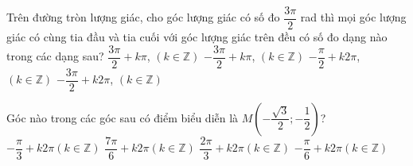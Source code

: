 \begin{ex}%
	Trên đường tròn lượng giác, cho góc lượng giác có số đo $\dfrac{3\pi}{2}$ rad thì mọi góc lượng giác có cùng tia  đầu và tia cuối với góc lượng giác trên đều có số đo dạng nào trong các dạng sau?
	\choice 
		{$\dfrac{3\pi}{2}+k \pi$,  $(k \in \mathbb{Z})$}
		{$-\dfrac{3\pi}{2}+k \pi$, $(k \in  \mathbb{Z})$}
		{\True $-\dfrac{\pi}{2}+k  2\pi$, $(k \in \mathbb{Z})$}
		 {$-\dfrac{3\pi}{2}+k 2\pi$, $(k \in \mathbb{Z})$}
\end{ex}

\begin{ex}%
	Góc nào trong các góc sau có điểm biểu diễn là  $M\left(-\dfrac{\sqrt{3}}{2};-\dfrac{1}{2} \right)$?
	 \choice
		{$-\dfrac{\pi}{3}+k2\pi  \left(k\in \mathbb{Z}\right)$}
		{\True $\dfrac{7\pi}{6}+k2\pi \left(k\in \mathbb{Z}\right)$} 
		{$\dfrac{2\pi}{3}+k2\pi  \left(k\in \mathbb{Z}\right)$}
		{$-\dfrac{\pi}{6}+k2\pi  \left(k\in \mathbb{Z}\right)$}
\end{ex}

